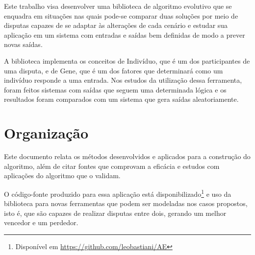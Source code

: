 Este trabalho visa desenvolver uma biblioteca de algoritmo evolutivo que se enquadra em situações nas quais pode-se comparar duas soluções por meio de disputas capazes de se adaptar às alterações de cada cenário e estudar sua aplicação em um sistema com entradas e saídas bem definidas de modo a prever novas saídas.

A biblioteca implementa os conceitos de Indivíduo, que é um dos participantes de uma disputa, e de Gene, que é um dos fatores que determinará como um indivíduo responde a uma entrada. Nos estudos da utilização dessa ferramenta, foram feitos sistemas com saídas que seguem uma determinada lógica e os resultados foram comparados com um sistema que gera saídas aleatoriamente.

\section{Organização}

Este documento relata os métodos desenvolvidos e aplicados para a construção do algoritmo, além de citar fontes que comprovam a eficácia e estudos com aplicações do algoritmo que o validam.

O código-fonte produzido para essa aplicação está disponibilizado\footnote{Disponível em \url{https://github.com/leobastiani/AE}} e uso da biblioteca para novas ferramentas que podem ser modeladas nos casos propostos, isto é, que são capazes de realizar disputas entre dois, gerando um melhor vencedor e um perdedor.
